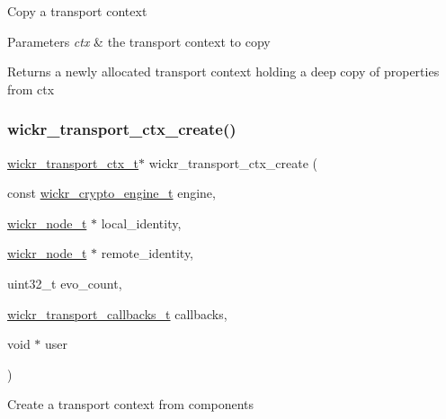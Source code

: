 Copy a transport context


\begin{DoxyParams}{Parameters}
{\em ctx} & the transport context to copy \\
\hline
\end{DoxyParams}
\begin{DoxyReturn}{Returns}
a newly allocated transport context holding a deep copy of properties from \textquotesingle{}ctx\textquotesingle{} 
\end{DoxyReturn}
\mbox{\label{group__wickr__transport__ctx_ga4731758cf20b71d4469c74904bf662c0}} 
\subsubsection{\texorpdfstring{wickr\+\_\+transport\+\_\+ctx\+\_\+create()}{wickr\_transport\_ctx\_create()}}
{\footnotesize\ttfamily \mbox{\hyperlink{structwickr__transport__ctx}{wickr\+\_\+transport\+\_\+ctx\+\_\+t}}$\ast$ wickr\+\_\+transport\+\_\+ctx\+\_\+create (\begin{DoxyParamCaption}\item[{const \mbox{\hyperlink{structwickr__crypto__engine}{wickr\+\_\+crypto\+\_\+engine\+\_\+t}}}]{engine,  }\item[{\mbox{\hyperlink{structwickr__node}{wickr\+\_\+node\+\_\+t}} $\ast$}]{local\+\_\+identity,  }\item[{\mbox{\hyperlink{structwickr__node}{wickr\+\_\+node\+\_\+t}} $\ast$}]{remote\+\_\+identity,  }\item[{uint32\+\_\+t}]{evo\+\_\+count,  }\item[{\mbox{\hyperlink{structwickr__transport__callbacks}{wickr\+\_\+transport\+\_\+callbacks\+\_\+t}}}]{callbacks,  }\item[{void $\ast$}]{user }\end{DoxyParamCaption})}

Create a transport context from components


